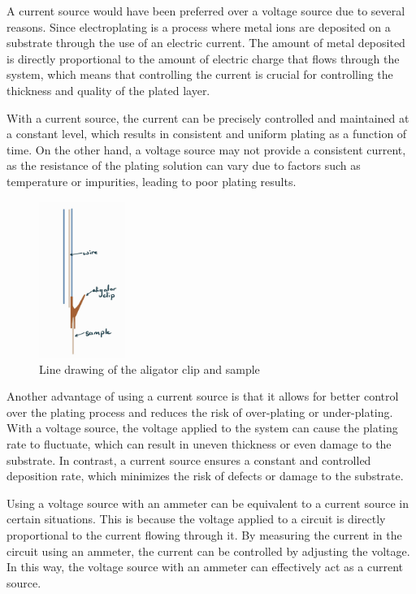 A current source would have been preferred over a voltage source due to several reasons. Since electroplating is a process where metal ions are deposited on a substrate through the use of an electric current. The amount of metal deposited is directly proportional to the amount of electric charge that flows through the system, which means that controlling the current is crucial for controlling the thickness and quality of the plated layer.

With a current source, the current can be precisely controlled and maintained at a constant level, which results in consistent and uniform plating as a function of time. On the other hand, a voltage source may not provide a consistent current, as the resistance of the plating solution can vary due to factors such as temperature or impurities, leading to poor plating results.


\begin{figure}
    \centering
    \includegraphics[width=0.25\textwidth]{Main/Ch1/Current Sample holder.png}
    \caption{Line drawing of the aligator clip and sample }
\end{figure}

Another advantage of using a current source is that it allows for better control over the plating process and reduces the risk of over-plating or under-plating. With a voltage source, the voltage applied to the system can cause the plating rate to fluctuate, which can result in uneven thickness or even damage to the substrate. In contrast, a current source ensures a constant and controlled deposition rate, which minimizes the risk of defects or damage to the substrate.

Using a voltage source with an ammeter can be equivalent to a current source in certain situations. This is because the voltage applied to a circuit is directly proportional to the current flowing through it. By measuring the current in the circuit using an ammeter, the current can be controlled by adjusting the voltage. In this way, the voltage source with an ammeter can effectively act as a current source.


